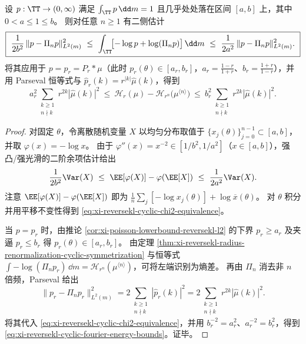\begin{theorem}\label{thm:xi-reversekl-cyclic-energy-equivalence}
设 \(p:\TT\to(0,\infty)\) 满足 \(\int_{\TT}p\,\dd m=1\) 且几乎处处落在区间 \([a,b]\) 上，其中 \(0<a\le 1\le b\)。
则对任意 \(n\ge 1\) 有二侧估计
\begin{equation}\label{eq:xi-reversekl-cyclic-chi2-equivalence}
\boxed{\
\frac1{2b^2}\,\|p-\Pi_n p\|_{L^2(m)}^2
\ \le\
\int_{\TT}\!\bigl[-\log p+\log(\Pi_n p)\bigr]\,\dd m
\ \le\
\frac1{2a^2}\,\|p-\Pi_n p\|_{L^2(m)}^2.
\ }
\end{equation}
将其应用于 \(p=p_r=P_r*\mu\)（此时 \(p_r(\theta)\in[a_r,b_r]\)，\(a_r=\frac{1-r}{1+r}\)、\(b_r=\frac{1+r}{1-r}\)），并用 Parseval 恒等式与 \(\widehat p_r(k)=r^{|k|}\widehat\mu(k)\)，得到
\begin{equation}\label{eq:xi-reversekl-cyclic-fourier-energy-bounds}
\boxed{\
a_r^2\!\sum_{\substack{k\ge 1\\ n\nmid k}} r^{2k}|\widehat\mu(k)|^2
\ \le\
\mathcal H_r(\mu)-\mathcal H_{r^n}\!\bigl(\mu^{\langle n\rangle}\bigr)
\ \le\
b_r^2\!\sum_{\substack{k\ge 1\\ n\nmid k}} r^{2k}|\widehat\mu(k)|^2.
\ }
\end{equation}
\end{theorem}
\begin{proof}
对固定 \(\theta\)，令离散随机变量 \(X\) 以均匀分布取值于 \(\{x_j(\theta)\}_{j=0}^{n-1}\subset[a,b]\)，并取 \(\varphi(x)=-\log x\)。
由于 \(\varphi''(x)=x^{-2}\in[1/b^2,1/a^2]\)（\(x\in[a,b]\)），强凸/强光滑的二阶余项估计给出
\[
\frac1{2b^2}\Var(X)\ \le\ \EE[\varphi(X)]-\varphi(\EE[X])\ \le\ \frac1{2a^2}\Var(X).
\]
注意 \(\EE[\varphi(X)]-\varphi(\EE[X])\) 即为
\(\frac1n\sum_j[-\log x_j(\theta)]+\log\overline x(\theta)\)。
对 \(\theta\) 积分并用平移不变性得到 \eqref{eq:xi-reversekl-cyclic-chi2-equivalence}。

当 \(p=p_r\) 时，由推论 \ref{cor:xi-poisson-lowerbound-reversekl-l2} 的下界 \(p_r\ge a_r\) 及夹逼 \(p_r\le b_r\) 得 \(p_r(\theta)\in[a_r,b_r]\)。
由定理 \ref{thm:xi-reversekl-radius-renormalization-cyclic-symmetrization} 与恒等式
\(\int -\log(\Pi_n p_r)\,\dd m=\mathcal H_{r^n}(\mu^{\langle n\rangle})\)，可将左端识别为熵差。
再由 \(\Pi_n\) 消去非 \(n\) 倍频，Parseval 给出
\[
\|p_r-\Pi_n p_r\|_{L^2(m)}^2
=2\sum_{\substack{k\ge 1\\ n\nmid k}}|\widehat p_r(k)|^2
=2\sum_{\substack{k\ge 1\\ n\nmid k}}r^{2k}|\widehat\mu(k)|^2.
\]
将其代入 \eqref{eq:xi-reversekl-cyclic-chi2-equivalence}，并用 \(b_r^{-2}=a_r^2\)、\(a_r^{-2}=b_r^2\)，得到 \eqref{eq:xi-reversekl-cyclic-fourier-energy-bounds}。证毕。
\end{proof}

